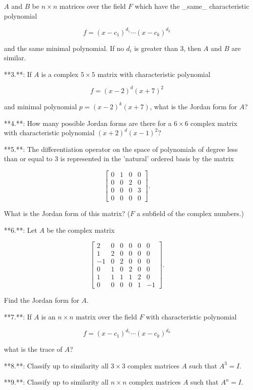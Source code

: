 \(A\) and \(B\) be \(n\times n\) matrices over the field \(F\) which have the _same_ characteristic polynomial

\[f=(x-c_{1})^{d_{1}}\cdots(x-c_{k})^{d_{k}}\]

and the same minimal polynomial. If no \(d_{i}\) is greater than 3, then \(A\) and \(B\) are similar.

**3.**: If \(A\) is a complex \(5\times 5\) matrix with characteristic polynomial

\[f=(x-2)^{d}(x+7)^{2}\]

and minimal polynomial \(p=(x-2)^{k}(x+7)\), what is the Jordan form for \(A\)?

**4.**: How many possible Jordan forms are there for a \(6\times 6\) complex matrix with characteristic polynomial \((x+2)^{d}(x-1)^{2}\)?

**5.**: The differentiation operator on the space of polynomials of degree less than or equal to 3 is represented in the 'natural' ordered basis by the matrix

\[\begin{bmatrix}0&1&0&0\\ 0&0&2&0\\ 0&0&0&3\\ 0&0&0&0\end{bmatrix}.\]

What is the Jordan form of this matrix? (\(F\) a subfield of the complex numbers.)

**6.**: Let \(A\) be the complex matrix

\[\begin{bmatrix}2&0&0&0&0&0\\ 1&2&0&0&0&0\\ -1&0&2&0&0&0\\ 0&1&0&2&0&0\\ 1&1&1&1&2&0\\ 0&0&0&0&1&-1\end{bmatrix}.\]

Find the Jordan form for \(A\).

**7.**: If \(A\) is an \(n\times n\) matrix over the field \(F\) with characteristic polynomial

\[f=(x-c_{1})^{d_{1}}\cdots(x-c_{k})^{d_{k}}\]

what is the trace of \(A\)?

**8.**: Classify up to similarity all \(3\times 3\) complex matrices \(A\) such that \(A^{3}=I\).

**9.**: Classify up to similarity all \(n\times n\) complex matrices \(A\) such that \(A^{n}=I\).

